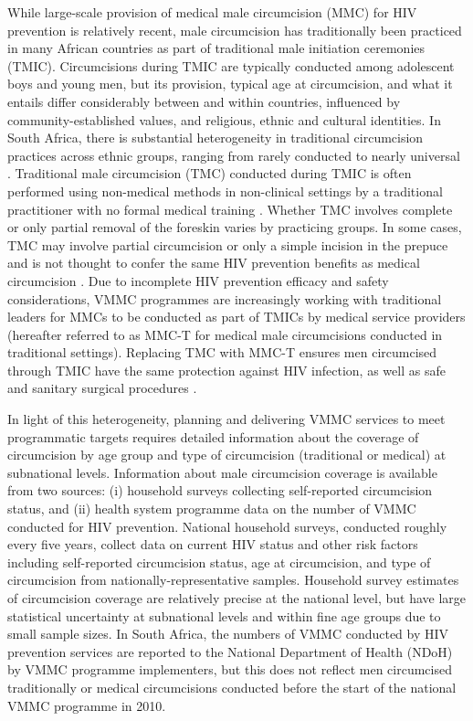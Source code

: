 \documentclass{article}
\begin{document}
While large-scale provision of medical male circumcision (MMC) for HIV prevention is relatively recent, male circumcision has traditionally been practiced in many African countries as part of traditional male initiation ceremonies (TMIC). Circumcisions during TMIC are typically conducted among adolescent boys and young men, but its provision, typical age at circumcision, and what it entails differ considerably between and within countries, influenced by community-established values, and religious, ethnic and cultural identities. In South Africa, there is substantial heterogeneity in traditional circumcision practices across ethnic groups, ranging from rarely conducted to nearly universal \cite{peltzer2014prevalence, connolly2008male}. Traditional male circumcision (TMC) conducted during TMIC is often performed using non-medical methods in non-clinical settings by a traditional practitioner with no formal medical training \cite{drain2006male, wilcken2010traditional, weiss2000male}. Whether TMC involves complete or only partial removal of the foreskin varies by practicing groups. In some cases, TMC may involve partial circumcision or only a simple incision in the prepuce and is not thought to confer the same HIV prevention benefits as medical circumcision \cite{WHOTraditional, shaffer2007protective, bailey2008male}. Due to incomplete HIV prevention efficacy and safety considerations, VMMC programmes are increasingly working with traditional leaders for MMCs to be conducted as part of TMICs by medical service providers (hereafter referred to as MMC-T for medical male circumcisions conducted in traditional settings). Replacing TMC with MMC-T ensures men circumcised through TMIC have the same protection against HIV infection, as well as safe and sanitary surgical procedures \cite{WHOTraditional}.

In light of this heterogeneity, planning and delivering VMMC services to meet programmatic targets requires detailed information about the coverage of circumcision by age group and type of circumcision (traditional or medical) at subnational levels. Information about male circumcision coverage is available from two sources: (i) household surveys collecting self-reported circumcision status, and (ii) health system programme data on the number of VMMC conducted for HIV prevention. National household surveys, conducted roughly every five years, collect data on current HIV status and other risk factors including self-reported circumcision status, age at circumcision, and type of circumcision from nationally-representative samples. Household survey estimates of circumcision coverage are relatively precise at the national level, but have large statistical uncertainty at subnational levels and within fine age groups due to small sample sizes. In South Africa, the numbers of VMMC conducted by HIV prevention services are reported to the National Department of Health (NDoH) by VMMC programme implementers, but this does not reflect men circumcised traditionally or medical circumcisions conducted before the start of the national VMMC programme in 2010.
\end{document}
